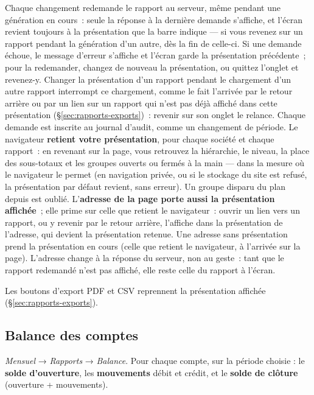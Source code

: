 \documentclass[a4paper,11pt,oneside]{article}
\begin{document}
Chaque changement redemande le rapport au serveur, même pendant une génération en cours~: seule
la réponse à la dernière demande s'affiche, et l'écran revient toujours à la présentation que la
barre indique --- si vous revenez sur un rapport pendant la génération d'un autre, dès la fin de
celle-ci. Si une demande échoue, le message d'erreur s'affiche et l'écran garde la présentation
précédente~; pour la redemander, changez de nouveau la présentation, ou quittez l'onglet et revenez-y.
Changer la présentation d'un rapport pendant le chargement d'un autre rapport interrompt ce chargement, comme le fait l'arrivée par le retour arrière ou
par un lien sur un rapport qui n'est pas déjà affiché dans cette présentation (\S\ref{sec:rapports-exports})~: revenir
sur son onglet le relance. Chaque demande est inscrite au journal
d'audit, comme un changement de période. Le navigateur \textbf{retient votre présentation}, pour
chaque société et chaque rapport~: en revenant sur la page, vous retrouvez la hiérarchie, le
niveau, la place des sous-totaux et les groupes ouverts ou fermés à la main --- dans la mesure où
le navigateur le permet (en navigation privée, ou si le stockage du site est refusé, la
présentation par défaut revient, sans erreur). Un groupe disparu du plan depuis est oublié.
L'\textbf{adresse de la page porte aussi la présentation affichée}~; elle prime sur celle que
retient le navigateur~: ouvrir un lien vers un rapport, ou y revenir par le retour arrière, l'affiche
dans la présentation de l'adresse, qui devient la présentation retenue. Une adresse sans présentation
prend la présentation en cours (celle que retient le navigateur, à l'arrivée sur la page). L'adresse change à la réponse du serveur, non au geste~: tant
que le rapport redemandé n'est pas affiché, elle reste celle du rapport à l'écran.

Les boutons d'export PDF et CSV reprennent la présentation affichée
(\S\ref{sec:rapports-exports}).

\subsection{Balance des comptes}

\emph{Mensuel} → \emph{Rapports} → \emph{Balance}. Pour chaque compte, sur la période choisie : le \textbf{solde
d'ouverture}, les \textbf{mouvements} débit et crédit, et le \textbf{solde de clôture} (ouverture + mouvements).
\end{document}
